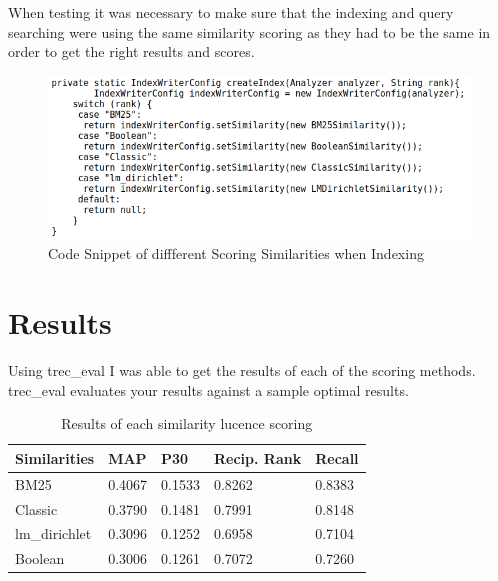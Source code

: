 When testing it was necessary to make sure that the indexing and query searching were using the same similarity scoring as they had to be the same in order to get the right results and scores. \par
 
	\begin{figure}[ht!]
		\begin{center}
			\includegraphics[scale=.35 ]{3} 
			\caption{Code Snippet of diffferent Scoring Similarities when Indexing}
			\label{fig:1}
		\end{center}
	\end{figure} \par



\section{Results}
Using trec\_eval I was able to get the results of each of the scoring methods. trec\_eval evaluates your results against a sample optimal results. \newline 


\begin{table}[H]
	\centering
	\begin{tabular}{|p{1.5cm}|p{1.25cm}|p{1.25cm}|p{1.25cm}|p{1.25cm}|}
	\hline Similarities & MAP & P30 & Recip. Rank & Recall \\ \hline
			BM25 					& 0.4067  & 0.1533 & 0.8262 & 0.8383 \\ \hline
			Classic 				& 0.3790  & 0.1481 & 0.7991 & 0.8148 \\ \hline
			lm\_dirichlet 			& 0.3096  & 0.1252 & 0.6958 & 0.7104 \\ \hline
			Boolean 				& 0.3006  & 0.1261 & 0.7072 & 0.7260 \\ \hline
			
	\end{tabular} 
	\caption{Results of each similarity lucence scoring}
	\label{table:results}
\end{table}
	
